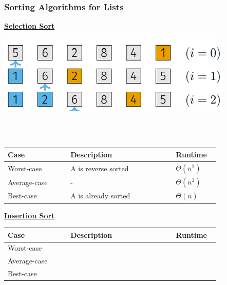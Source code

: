 \subsubsection{Sorting Algorithms for Lists} \label{section_sorting_list}
    {\centering\underline{\textbf{Selection Sort}} \par}
        \begin{minipage}{0.59\linewidth}
            \includegraphics[width = \linewidth]{src/3_containers/images/selection_sort.png}
        \end{minipage}
        \begin{minipage}{0.39\linewidth}
            \\
            \\
        \end{minipage}

        
        
        \begin{tabular*}{\linewidth}{| p{0.25\linewidth} | p{0.42\linewidth} | p{0.15\linewidth} |}
            \hline
            Case & Description & Runtime\\
            \hline \hline
            Worst-case & A is reverse sorted & $\Theta(n^2)$ \\
            \hline
            Average-case & - & $\Theta(n^2)$ \\
            \hline
            Best-case & A is already sorted & $\Theta(n)$ \\
            \hline
        \end{tabular*}

    {\centering\underline{\textbf{Insertion Sort}} \par}
        \begin{tabular*}{\linewidth}{| p{0.25\linewidth} | p{0.42\linewidth} | p{0.15\linewidth} |}
            \hline
            Case & Description & Runtime\\
            \hline \hline
            Worst-case &  &  \\
            \hline
            Average-case &  &  \\
            \hline
            Best-case &  &  \\
            \hline
        \end{tabular*}

